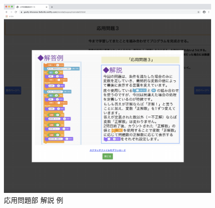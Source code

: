 \begin{figure}[h]
\begin{center}
\includegraphics[width=15cm]{ouyoukotae.pdf}
\caption{応用問題部 解説 例}
\label{fig:ouyouk}
\end{center}
\end{figure}

